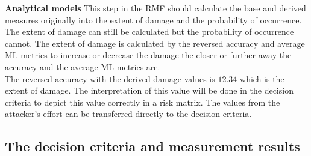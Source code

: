 \noindent\textbf{Analytical models} This step in the RMF should calculate the base and derived measures originally into the extent of damage and the probability of occurrence. The extent of damage can still be calculated but the probability of occurrence cannot. The extent of damage is calculated by the reversed accuracy and average ML metrics to increase or decrease the damage the closer or further away the accuracy and the average ML metrics are. \\
The reversed accuracy with the derived damage values is $12.34$ which is the extent of damage. The interpretation of this value will be done in the decision criteria to depict this value correctly in a risk matrix. The values from the attacker's effort can be transferred directly to the decision criteria.

\subsection{The decision criteria and measurement results}

